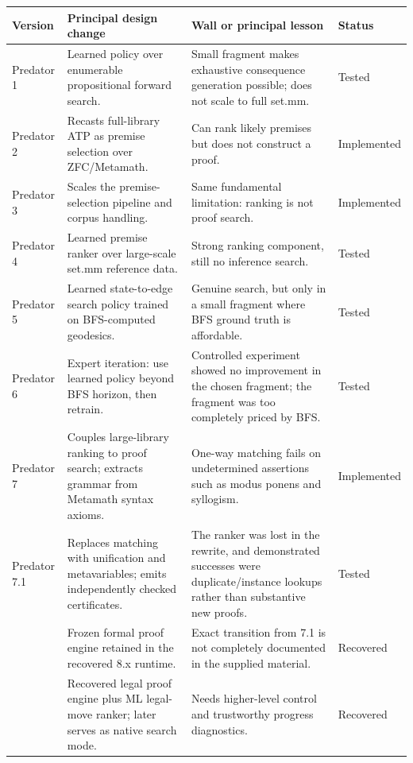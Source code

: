 \documentclass[11pt]{article}
\begin{document}
\small
\renewcommand{\arraystretch}{1.17}
\begin{longtable}{>{\raggedright\arraybackslash}p{} >{\raggedright\arraybackslash}p{} >{\raggedright\arraybackslash}p{} >{\raggedright\arraybackslash}p{}}
\toprule
\textbf{Version} & \textbf{Principal design change} & \textbf{Wall or principal lesson} & \textbf{Status}\\
\midrule
\endhead
Predator 1 & Learned policy over enumerable propositional forward search. & Small fragment makes exhaustive consequence generation possible; does not scale to full set.mm. & Tested \\
Predator 2 & Recasts full-library ATP as premise selection over ZFC/Metamath. & Can rank likely premises but does not construct a proof. & Implemented \\
Predator 3 & Scales the premise-selection pipeline and corpus handling. & Same fundamental limitation: ranking is not proof search. & Implemented \\
Predator 4 & Learned premise ranker over large-scale set.mm reference data. & Strong ranking component, still no inference search. & Tested \\
Predator 5 & Learned state-to-edge search policy trained on BFS-computed geodesics. & Genuine search, but only in a small fragment where BFS ground truth is affordable. & Tested \\
Predator 6 & Expert iteration: use learned policy beyond BFS horizon, then retrain. & Controlled experiment showed no improvement in the chosen fragment; the fragment was too completely priced by BFS. & Tested \\
Predator 7 & Couples large-library ranking to proof search; extracts grammar from Metamath syntax axioms. & One-way matching fails on undetermined assertions such as modus ponens and syllogism. & Implemented \\
Predator 7.1 & Replaces matching with unification and metavariables; emits independently checked certificates. & The ranker was lost in the rewrite, and demonstrated successes were duplicate/instance lookups rather than substantive new proofs. & Tested \\
8.001 & Frozen formal proof engine retained in the recovered 8.x runtime. & Exact transition from 7.1 is not completely documented in the supplied material. & Recovered \\
8.002 & Recovered legal proof engine plus ML legal-move ranker; later serves as native search mode. & Needs higher-level control and trustworthy progress diagnostics. & Recovered \\

\end{longtable}
\end{document}
